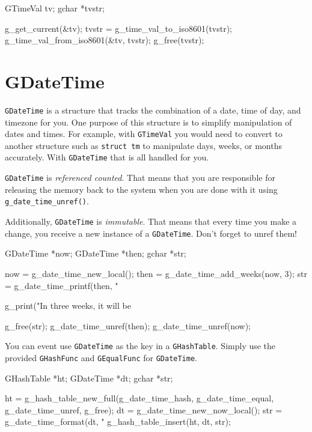 \begin{code}{}
GTimeVal tv;
gchar *tvstr;

g_get_current(&tv);
tvstr = g_time_val_to_iso8601(tvstr);
g_time_val_from_iso8601(&tv, tvstr);
g_free(tvstr);
\end{code}


\section{GDateTime}

\verb|GDateTime| is a structure that tracks the combination of a date, time of day, and timezone for you.
One purpose of this structure is to simplify manipulation of dates and times.
For example, with \verb|GTimeVal| you would need to convert to another structure such as \verb|struct tm| to manipulate days, weeks, or months accurately.
With \verb|GDateTime| that is all handled for you.

\verb|GDateTime| is \emph{referenced counted}.
That means that you are responsible for releasing the memory back to the system when you are done with it using \verb|g_date_time_unref()|.

Additionally, \verb|GDateTime| is \emph{immutable}.
That means that every time you make a change, you receive a new instance of a \verb|GDateTime|.
Don't forget to unref them!

\begin{code}{}
GDateTime *now;
GDateTime *then;
gchar *str;

now = g_date_time_new_local();
then = g_date_time_add_weeks(now, 3);
str = g_date_time_printf(then, "%

g_print("In three weeks, it will be %

g_free(str);
g_date_time_unref(then);
g_date_time_unref(now);
\end{code}

You can event use \verb|GDateTime| as the key in a \verb|GHashTable|.
Simply use the provided \verb|GHashFunc| and \verb|GEqualFunc| for \verb|GDateTime|.

\begin{code}{}
GHashTable *ht;
GDateTime *dt;
gchar *str;

ht = g_hash_table_new_full(g_date_time_hash,
                           g_date_time_equal,
                           g_date_time_unref,
                           g_free);
dt = g_date_time_new_now_local();
str = g_date_time_format(dt, "%
g_hash_table_insert(ht, dt, str);
\end{code}


